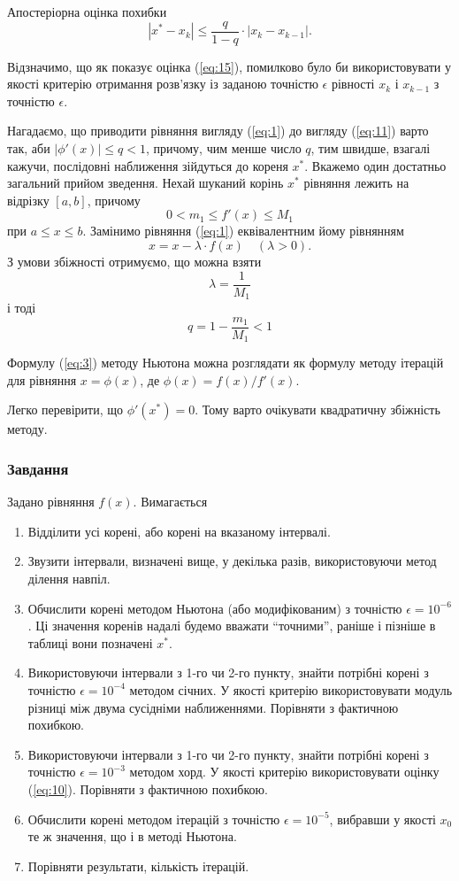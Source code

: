 Апостеріорна оцінка похибки
\begin{equation}
	\label{eq:15}
	|x^* - x_k| \le \frac{q}{1 - q} \cdot |x_k - x_{k-1}|. 
\end{equation}

Відзначимо, що як показує оцінка (\ref{eq:15}), помилково було би використовувати у якості критерію отримання розв'язку із заданою точністю $\epsilon$ рівності $x_k$ і $x_{k-1}$ з точністю $\epsilon$.
\begin{remark}
	Нагадаємо, що приводити рівняння вигляду (\ref{eq:1}) до вигляду (\ref{eq:11}) варто так, аби $|\phi'(x)| \le q < 1$, причому, чим менше число $q$, тим швидше, взагалі кажучи, послідовні наближення зійдуться до кореня $x^*$. Вкажемо один достатньо загальний прийом зведення. Нехай шуканий корінь $x^*$  рівняння лежить на відрізку $[a, b]$, причому
	\[ 0 < m_1 \le f'(x) \le M_1 \]
	при $a \le x \le b$. Замінимо рівняння (\ref{eq:1}) еквівалентним йому рівнянням
	\[ x = x - \lambda \cdot f(x) \quad (\lambda > 0). \]
	З умови збіжності отримуємо, що можна взяти 
	\[ \lambda = \frac{1}{M_1} \]
	і тоді 
	\[ q = 1 - \frac{m_1}{M_1} < 1 \]
\end{remark}

\begin{remark}
	Формулу (\ref{eq:3}) методу Ньютона можна розглядати як формулу методу ітерацій для рівняння $x = \phi(x)$, де $\phi(x) = f(x) / f'(x)$.
\end{remark}

Легко перевірити, що $\phi'(x^*) = 0$. Тому варто очікувати квадратичну збіжність методу.

\subsubsection{Завдання}

Задано рівняння $f(x)$. Вимагається
\begin{enumerate}
	\item Відділити усі корені, або корені на вказаному інтервалі. 
	\item Звузити інтервали, визначені вище, у декілька разів, використовуючи метод ділення навпіл.
	\item Обчислити корені методом Ньютона (або модифікованим) з точністю $\epsilon = 10^{-6}$. Ці значення коренів надалі будемо вважати ``точними'', раніше і пізніше в таблиці вони позначені $x^*$.
	\item Використовуючи інтервали з 1-го чи 2-го пункту, знайти потрібні корені з точністю $\epsilon = 10^{-4}$ методом січних. У якості критерію використовувати модуль різниці між двума сусідніми наближеннями. Порівняти з фактичною похибкою.
	\item Використовуючи інтервали з 1-го чи 2-го пункту, знайти потрібні корені з точністю $\epsilon = 10^{-3}$ методом хорд. У якості критерію використовувати оцінку (\ref{eq:10}). Порівняти з фактичною похибкою.
	\item Обчислити корені методом ітерацій з точністю $\epsilon = 10^{-5}$, вибравши у якості $x_0$ те ж значення, що і в методі Ньютона.
	\item Порівняти результати, кількість ітерацій.
\end{enumerate}

